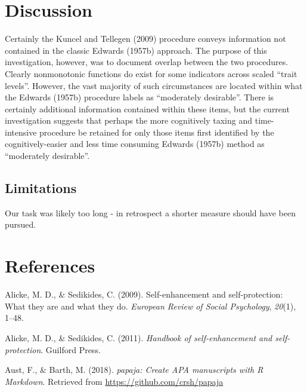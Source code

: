 \documentclass[
  english,
  ,jou]{apa6}
\begin{document}
\hypertarget{discussion}{%
\section{Discussion}\label{discussion}}

Certainly the Kuncel and Tellegen (2009) procedure conveys information not contained in the classic Edwards (1957b) approach. The purpose of this investigation, however, was to document overlap between the two procedures. Clearly nonmonotonic functions do exist for some indicators across scaled \enquote{trait levels}. However, the vast majority of such circumstances are located within what the Edwards (1957b) procedure labels as \enquote{moderately desirable}. There is certainly additional information contained within these items, but the current investigation suggests that perhaps the more cognitively taxing and time-intensive procedure be retained for only those items first identified by the cognitively-easier and less time consuming Edwards (1957b) method as \enquote{moderately desirable}.

\hypertarget{limitations}{%
\subsection{Limitations}\label{limitations}}

Our task was likely too long - in retrospect a shorter measure should have been pursued.

\hypertarget{references}{%
\section{References}\label{references}}

\begingroup
\setlength{\parindent}{-0.5in}
\setlength{\leftskip}{0.5in}

\hypertarget{refs}{}
\leavevmode\hypertarget{ref-alicke_self-enhancement_2009}{}%
Alicke, M. D., \& Sedikides, C. (2009). Self-enhancement and self-protection: What they are and what they do. \emph{European Review of Social Psychology}, \emph{20}(1), 1--48.

\leavevmode\hypertarget{ref-alicke_handbook_2011}{}%
Alicke, M. D., \& Sedikides, C. (2011). \emph{Handbook of self-enhancement and self-protection}. Guilford Press.

\leavevmode\hypertarget{ref-R-papaja}{}%
Aust, F., \& Barth, M. (2018). \emph{papaja: Create APA manuscripts with R Markdown}. Retrieved from \url{https://github.com/crsh/papaja}
\end{document}
